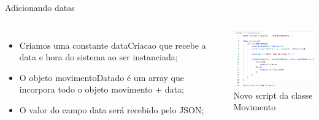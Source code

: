 \documentclass{beamer}
\begin{document}
    \begin{frame}[label=lists]{Adicionando datas}
      \begin{columns}[onlytextwidth]
          \begin{itemize}
            \item Criamos uma constante dataCriacao que recebe a data e hora do sistema ao ser instanciada;
            \item O objeto movimentoDatado é um array que incorpora todo o objeto movimento + data;
            \item O valor do campo data será recebido pelo JSON;
          \end{itemize}
            \includegraphics[width=60mm]{resources/aula9_1.png}\\
            \tiny{Novo script da classe Movimento}
      \end{columns}
    \end{frame}
%
%
  
\end{document}
